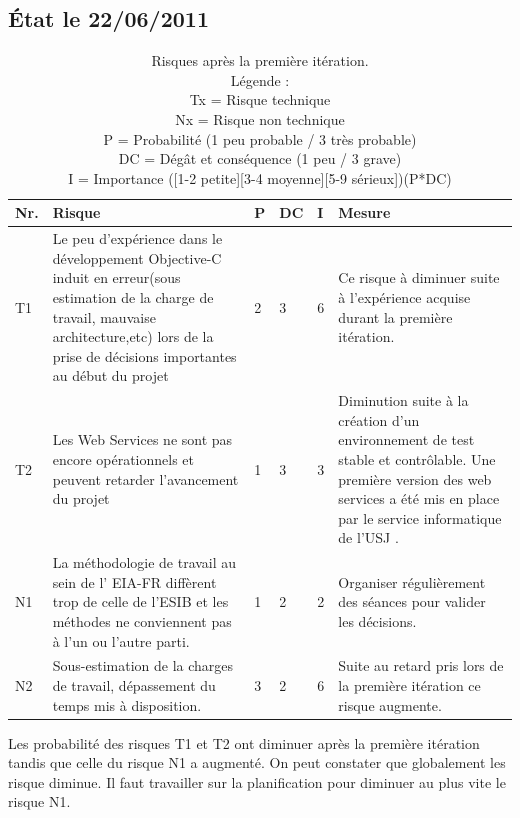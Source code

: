 	\subsection{État le 22/06/2011  }
	\begin{table}[H]
	\begin{tabular}{|l|p{6cm}|l|l|l|p{6cm}|}
		\hline  Nr. & Risque & P  & DC & I & Mesure \\ 
		\hline  {\color{green}T1} & Le peu d'expérience dans le développement \gls{Objective-C} induit en erreur(sous estimation de la charge de travail, mauvaise architecture,etc) lors de la prise de décisions importantes au début du projet & 2 & 3 & 6 & Ce risque à diminuer suite à l'expérience acquise durant la première itération.  \\ 
		\hline  {\color{green}T2} & Les Web Services ne sont pas encore opérationnels et peuvent retarder l'avancement du projet & 1 & 3 & 3 & Diminution suite à la création d'un environnement de test stable et contrôlable. Une première version des web services a été mis en place par le service informatique de l'\gls{USJ}  .  \\ 
		\hline  N1 & La méthodologie de travail au sein de l' \gls{EIA-FR} diffèrent trop de celle de l'\gls{ESIB}  et les méthodes ne conviennent pas à l'un ou l'autre parti.  & 1 & 2 & 2 & Organiser régulièrement des séances pour valider les décisions.  \\ 
		\hline  {\color{red}N2} & Sous-estimation de la charges de travail, dépassement du temps mis à disposition.  & 3 & 2 & 6 & Suite au retard pris lors de la première itération ce risque augmente.  \\ 
		
		\hline 
	\end{tabular} 
	\caption{ Risques après la première itération.\\ Légende :\\
Tx = Risque technique\\
Nx = Risque non technique\\
P = Probabilité  (1 peu probable / 3 très probable)\\ 
DC = Dégât et conséquence (1 peu / 3 grave)\\
I =  Importance ([1-2 petite][3-4 moyenne][5-9 sérieux])(P*DC)
}
	\end{table}
Les probabilité des risques T1 et T2  ont diminuer après la première itération tandis que celle du risque N1 a augmenté. On peut constater que globalement les risque diminue. Il faut travailler sur la planification pour diminuer au plus vite le risque N1.

